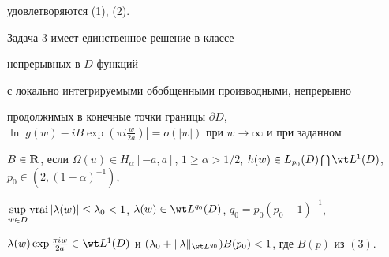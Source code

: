 удовлетворяются (1), (2).








\begin{thm}


Задача $3$ имеет единственное решение в классе


непрерывных в $D$ функций


с локально интегрируемыми обобщенными производными, непрерывно


продолжимых в конечные точки границы $\partial D$, $\ln |g(w) - i B


\exp (\pi i \frac{w}{2a})| = o(|w|)$ при $w \to \infty$ и при заданном


$B \in {\bold R}$, если $\Omega(u) \in H_{\alpha}[-a, a]$, $1 \geq \alpha


>1/2$, $h(w) \in L_{p_0}(D) \bigcap \wt L^1 (D)$, $p_0 \in (2, (1 -


\alpha)^{-1})$,


$\sup\limits_{w \in D} \vrai |\lambda(w)| \leq


\lambda_0 < 1$, $\lambda(w) \in \wt L^{q_0}(D)$, $q_0 = p_0(p_0 - 1)^{-1}$,


$\lambda(w) \exp \frac{\pi i w}{2a} \in \wt L^1(D)$ и $(\lambda_0 +


\|\lambda\|_{\wt L^{q_0}}) B(p_0) < 1$, где $B( p )$ из $(3)$.


\end{thm}





